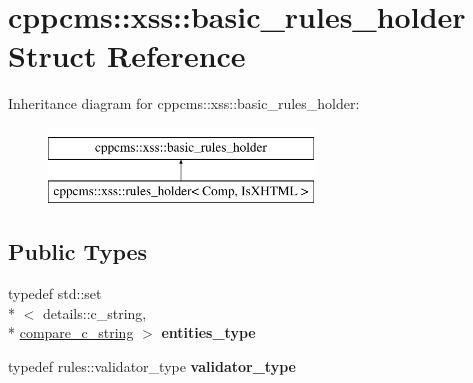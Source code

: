 \hypertarget{structcppcms_1_1xss_1_1basic__rules__holder}{\section{cppcms\-:\-:xss\-:\-:basic\-\_\-rules\-\_\-holder Struct Reference}
\label{structcppcms_1_1xss_1_1basic__rules__holder}
}
Inheritance diagram for cppcms\-:\-:xss\-:\-:basic\-\_\-rules\-\_\-holder\-:\begin{figure}[H]
\begin{center}
\leavevmode
\includegraphics[height=2.000000cm]{structcppcms_1_1xss_1_1basic__rules__holder}
\end{center}
\end{figure}
\subsection*{Public Types}
\begin{DoxyCompactItemize}
\item 
\hypertarget{structcppcms_1_1xss_1_1basic__rules__holder_a3b6848ead9426a5a8fc6682b83913abd}{typedef std\-::set\\*
$<$ details\-::c\-\_\-string, \\*
\hyperlink{structcppcms_1_1xss_1_1compare__c__string}{compare\-\_\-c\-\_\-string} $>$ {\bfseries entities\-\_\-type}}\label{structcppcms_1_1xss_1_1basic__rules__holder_a3b6848ead9426a5a8fc6682b83913abd}

\item 
\hypertarget{structcppcms_1_1xss_1_1basic__rules__holder_ad54e9bd0a99da64d20b9f2cdeee95e0a}{typedef rules\-::validator\-\_\-type {\bfseries validator\-\_\-type}}\label{structcppcms_1_1xss_1_1basic__rules__holder_ad54e9bd0a99da64d20b9f2cdeee95e0a}

\end{DoxyCompactItemize}
